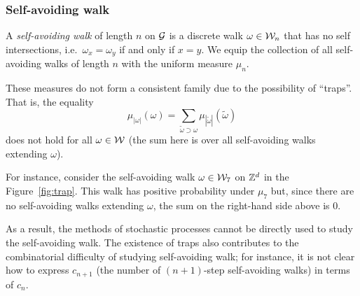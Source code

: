 
\subsubsection{Self-avoiding walk}

A \emph{self-avoiding walk} of length $n$ on $\mathcal{G}$ is a discrete walk $\omega\in\mathcal{W}_n$
that has no self intersections, i.e.\ $\omega_x = \omega_y$ if and only if $x = y$.
We equip the collection of all self-avoiding walks of length $n$ with the uniform measure $\mu_n$.

These measures do not form a consistent family due to the possibility of ``traps''.
That is, the equality
\begin{equation}
\mu_{|\omega|}(\omega) = \sum_{\tilde\omega \supset \omega} \mu_{|\tilde\omega|}(\tilde\omega)
\end{equation}
does not hold for all $\omega\in\mathcal{W}$ (the sum here is over all self-avoiding walks extending
$\omega$).


For instance, consider the self-avoiding walk $\omega\in\mathcal{W}_7$ on ${ {{\mathbb Z}}^d }$ in the Figure~\ref{fig:trap}.
This walk has positive probability under $\mu_7$ but,
since there are no self-avoiding walks extending $\omega$, the sum on the right-hand side
above is $0$.

As a result, the methods of stochastic processes cannot be directly used to study the self-avoiding
walk. The existence of traps also contributes to the combinatorial difficulty of studying
self-avoiding walk; for instance, it is not clear how to express $c_{n+1}$ (the number of
$(n+1)$-step self-avoiding walks) in terms of $c_n$.


